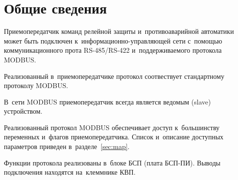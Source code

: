 \section{Общие сведения} \label{sec:overview}

Приемопередатчик команд релейной защиты и~противоаварийной автоматики \deviceCurrent{} может быть подключен к~информационно-управляющей сети с~помощью коммуникационного прота RS-485/RS-422 и~поддерживаемого протокола MODBUS. 

Реализованный в~приемопередатчике протокол соотвествует стандартному протоколу MODBUS.

В~сети MODBUS приемопередатчик \deviceCurrent{} всегда является ведомым
(slave) устройством.

Реализованный протокол MODBUS обеспечивает доступ к~большинству переменных и~флагов приемопередатчика. Список и~описание доступных параметров приведен в~разделе~\ref{sec:map}.

Функции протокола реализованы в~блоке БСП (плата БСП-ПИ). Выводы подключения находятся на~клеммнике КВП.